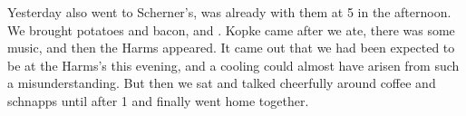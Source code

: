 
Yesterday also went to Scherner's, was already with them at 5 in the afternoon. We brought potatoes and bacon, and . Kopke came after we ate, there was some music, and then the Harms appeared. It came out that we had been expected to be at the Harms's this evening, and a cooling could almost have arisen from such a misunderstanding. But then we sat and talked cheerfully around coffee and schnapps until after 1 and finally went home together. \missing

